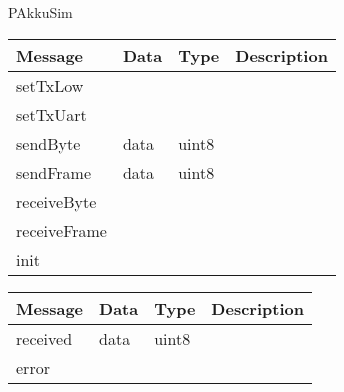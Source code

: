  {PAkkuSim}

\begin{tabular}[ht]{|l|l|l|p{8cm}|}
\hline
Message & Data & Type & Description\\
\hline
setTxLow &  &  & \\
\hline
setTxUart &  &  & \\
\hline
sendByte &  data  &  uint8  & \\
\hline
sendFrame &  data  &  uint8  & \\
\hline
receiveByte &  &  & \\
\hline
receiveFrame &  &  & \\
\hline
init &  &  & \\
\hline
\end{tabular}
\begin{tabular}[ht]{|l|l|l|p{8cm}|}
\hline
Message & Data & Type & Description\\
\hline
received &  data  &  uint8  & \\
\hline
error &  &  & \\
\hline
\end{tabular}
